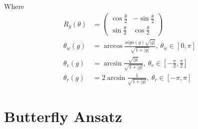 Where
\begin{equation*}
  \begin{split}
    R_y(\theta) & = \begin{pmatrix}
      \cos{\frac{\theta}{2}} & -\sin{\frac{\theta}{2}} \\
      \sin{\frac{\theta}{2}} & \cos{\frac{\theta}{2}} 
    \end{pmatrix} \\
    \theta_w(g) & = \arccos{\frac{sign(g)\sqrt{|g|}}{\sqrt{1+|g|}}},\ \theta_w \in [0, \pi] \\
    \theta_v(g) & = \arcsin{\frac{\sqrt{|g|}}{\sqrt{1+|g|}}},\ \theta_v \in [-\frac{\pi}{2}, \frac{\pi}{2}] \\
    \theta_r(g) & = 2\arcsin{\frac{1}{\sqrt{1+|g|}}},\ \theta_r \in [-\pi, \pi] 
  \end{split}
\end{equation*}

\section{Butterfly Ansatz}
\label{apx:butterfly_ansatz}

